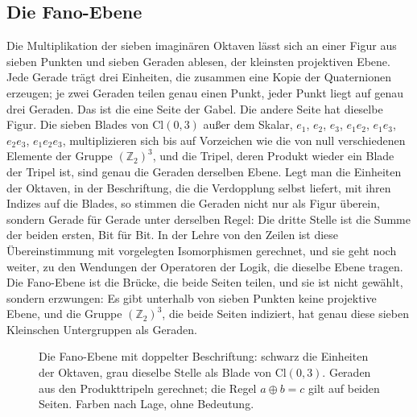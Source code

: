 \documentclass[11pt,a4paper]{article}
\newcommand{\Cl}{\mathrm{Cl}}
\begin{document}
\subsection{Die Fano-Ebene}

Die Multiplikation der sieben imaginären Oktaven lässt sich an einer Figur aus sieben Punkten und sieben Geraden ablesen, der kleinsten projektiven Ebene. Jede Gerade trägt drei Einheiten, die zusammen eine Kopie der Quaternionen erzeugen; je zwei Geraden teilen genau einen Punkt, jeder Punkt liegt auf genau drei Geraden. Das ist die eine Seite der Gabel. Die andere Seite hat dieselbe Figur. Die sieben Blades von $\Cl(0,3)$ außer dem Skalar, $e_1$, $e_2$, $e_3$, $e_1e_2$, $e_1e_3$, $e_2e_3$, $e_1e_2e_3$, multiplizieren sich bis auf Vorzeichen wie die von null verschiedenen Elemente der Gruppe $(\mathbb Z_2)^3$, und die Tripel, deren Produkt wieder ein Blade der Tripel ist, sind genau die Geraden derselben Ebene. Legt man die Einheiten der Oktaven, in der Beschriftung, die die Verdopplung selbst liefert, mit ihren Indizes auf die Blades, so stimmen die Geraden nicht nur als Figur überein, sondern Gerade für Gerade unter derselben Regel: Die dritte Stelle ist die Summe der beiden ersten, Bit für Bit. In der Lehre von den Zeilen ist diese Übereinstimmung mit vorgelegten Isomorphismen gerechnet, und sie geht noch weiter, zu den Wendungen der Operatoren der Logik, die dieselbe Ebene tragen. Die Fano-Ebene ist die Brücke, die beide Seiten teilen, und sie ist nicht gewählt, sondern erzwungen: Es gibt unterhalb von sieben Punkten keine projektive Ebene, und die Gruppe $(\mathbb Z_2)^3$, die beide Seiten indiziert, hat genau diese sieben Kleinschen Untergruppen als Geraden.

\begin{figure}[h]
\centering

\caption[Die Fano-Ebene auf beiden Seiten]{Die Fano-Ebene mit doppelter Beschriftung: schwarz die Einheiten der Oktaven, grau dieselbe Stelle als Blade von $\Cl(0,3)$. Geraden aus den Produkttripeln gerechnet; die Regel $a\oplus b=c$ gilt auf beiden Seiten. Farben nach Lage, ohne Bedeutung.}
\label{fig:fano}
\end{figure}
\end{document}
